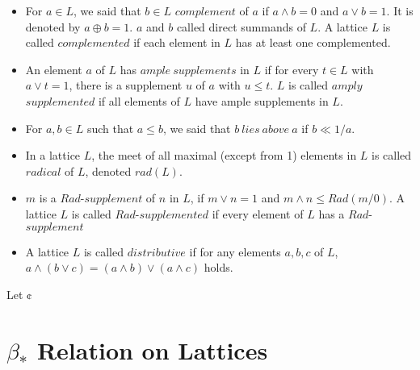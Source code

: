 \documentclass[handout]{beamer}
\begin{document}
\begin{frame}
\begin{itemize}[<+->]
    \item
        For $ a \in L $, we said that $ b \in L $ $ complement $ of $ a $ if $ a \wedge b = 0 $ and $ a \vee b = 1 $.
        It is denoted by $ a \oplus b = 1 $. $ a $ and $ b $ called direct summands of $ L $. A lattice $ L $ is called $ complemented $ if each
        element in $ L $ has at least one complemented.
    \item
        An element $ a $ of $ L $ has $ ample \  supplements $ in $ L $ if for every $ t \in L $ with  $ a \vee t = 1 $, 
        there is a supplement $ u $ of $ a $ with $ u \leq t $. 
        $ L $ is called $ amply$ $ supplemented $ if all elements of $ L $ have ample supplements in $ L $.
    \item
        For $ a,b \in L $ such that $ a \leq b $, we said that $ b \ lies \ above \ a $ if $ b \ll 1/a $.
    \item
        In a lattice $ L $, the meet of all maximal (except from 1) elements in $ L $ is called $ radical $ of $ L $, denoted $rad(L) $. 
    \item 
        $ m $ is a $Rad$-$supplement $ of $ n $ in $ L $, if $  m \vee n = 1 $ and $ m \wedge n \leq Rad(m/0) $.
        A lattice $ L $ is called $ Rad $-$supplemented $ if every element of $ L $ has a $ Rad $-$ supplement $
    \item
        A lattice $ L $ is called $ distributive $ if for any elements 
        $ a,b,c $ of $ L $, $ a \wedge ( b \vee c ) = ( a \wedge b ) \vee ( a \wedge c) $ holds.
\end{itemize}
\end{frame}
Let ¢



\section{$ \beta_* $ Relation on Lattices}
\end{document}
